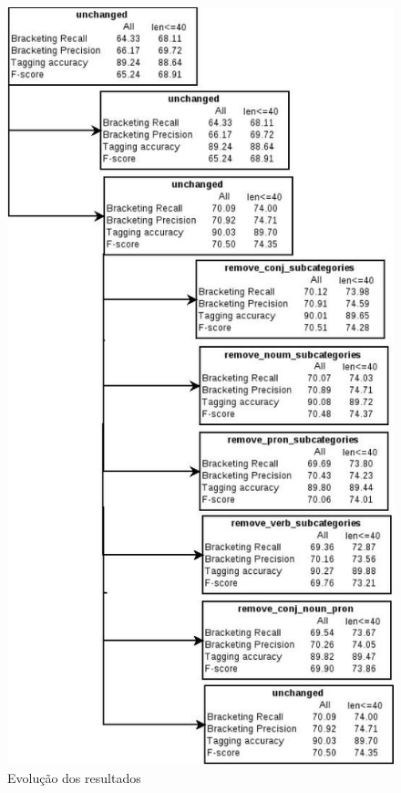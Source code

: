 
\begin{figure}
	\begin{center}
		\includegraphics[scale=0.35]{diagrama_experimentos1.jpeg}
		\caption{\label{evolucao} Evolução dos resultados }		
	\end{center}
\end{figure}


